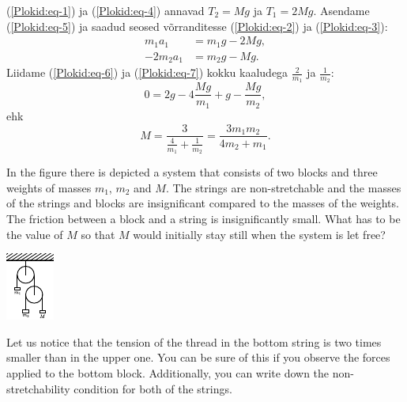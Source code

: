 (\ref{Plokid:eq-1}) ja (\ref{Plokid:eq-4}) annavad $T_2 = Mg$ ja $T_1 = 2Mg$. Asendame (\ref{Plokid:eq-5}) ja saadud seosed võrranditesse (\ref{Plokid:eq-2}) ja (\ref{Plokid:eq-3}):
\begin{align}
m_1a_1 &= m_1g - 2Mg, \label{Plokid:eq-6}\\
-2m_2a_1 &= m_2g - Mg. \label{Plokid:eq-7}
\end{align}
Liidame (\ref{Plokid:eq-6}) ja (\ref{Plokid:eq-7}) kokku kaaludega $\frac{2}{m_1}$ ja $\frac{1}{m_2}$:
\[
0 = 2g - 4\frac{Mg}{m_1} + g - \frac{Mg}{m_2},
\]
ehk
\[
M = \frac{3}{\frac{4}{m_1} + \frac{1}{m_2}} = \frac{3m_1m_2}{4m_2 + m_1}.
\]

In the figure there is depicted a system that consists of two blocks and three weights of masses $m_1$, $m_2$ and $M$. The strings are non-stretchable and the masses of the strings and blocks are insignificant compared to the masses of the weights. The friction between a block and a string is insignificantly small. What has to be the value of $M$ so that $M$ would initially stay still when the system is let free?
\begin{center}
	\includegraphics[width = 0.3\linewidth]  {2017-lahg-08-double_pulleys_img.pdf}
\end{center}

\hinteng
Let us notice that the tension of the thread in the bottom string is two times smaller than in the upper one. You can be sure of this if you observe the forces applied to the bottom block. Additionally, you can write down the non-stretchability condition for both of the strings.

